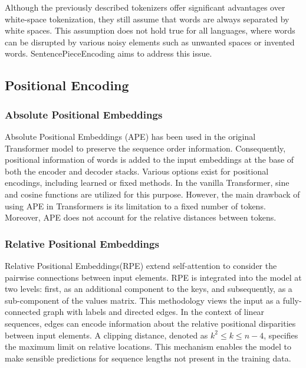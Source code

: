 Although the previously described tokenizers offer significant advantages over white-space tokenization, they still assume that words are always separated by white spaces. This assumption does not hold true for all languages, where words can be disrupted by various noisy elements such as unwanted spaces or invented words. SentencePieceEncoding aims to address this issue.

\subsection{Positional Encoding}

\subsubsection*{Absolute Positional Embeddings}

Absolute Positional Embeddings (APE) \cite{vaswani2023attention} has been used in the original Transformer model to preserve the sequence order information. Consequently, positional information of words is added to the input embeddings at the base of both the encoder and decoder stacks. Various options exist for positional encodings, including learned or fixed methods. In the vanilla Transformer, sine and cosine functions are utilized for this purpose. However, the main drawback of using APE in Transformers is its limitation to a fixed number of tokens. Moreover, APE does not account for the relative distances between tokens.


\subsubsection*{Relative Positional Embeddings}

Relative Positional Embeddings(RPE) \cite{shaw2018selfattention} extend self-attention to consider the pairwise connections between input elements. RPE is integrated into the model at two levels: first, as an additional component to the keys, and subsequently, as a sub-component of the values matrix. This methodology views the input as a fully-connected graph with labels and directed edges. In the context of linear sequences, edges can encode information about the relative positional disparities between input elements. A clipping distance, denoted as \( k^2 \leq k \leq n - 4 \), specifies the maximum limit on relative locations. This mechanism enables the model to make sensible predictions for sequence lengths not present in the training data.

